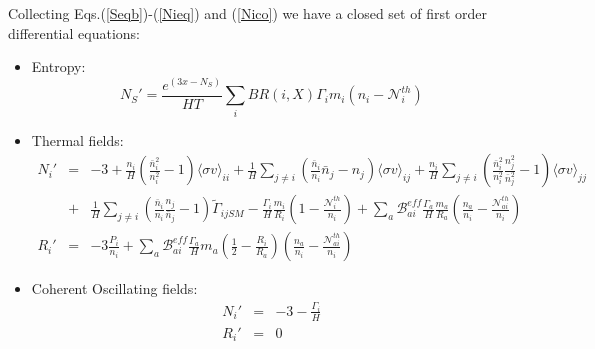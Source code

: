 \documentclass[preprint,notoc]{JHEP3}
\begin{document}
Collecting Eqs.(\ref{Seqb})-(\ref{Nieq}) and (\ref{Nico}) we have a closed set of first order differential equations:
\begin{itemize}
\item Entropy:
\begin{equation}
N_S' = \frac{e^{(3 x - N_S)}}{HT} \sum_{i} BR(i,X) \Gamma_i m_i \left(n_i -
\mathcal{N}_{i}^{th} \right) \label{eq:Sfin}
\end{equation}
\item Thermal fields:
\begin{eqnarray}
N_i'& = & -3
+ \frac{n_i}{H}\left( \frac{\bar{n}_i^2}{n_i^2} -1 \right) \langle \sigma v \rangle_{ii} 
+ \frac{1}{H} \sum_{j\neq i} \left( \frac{\bar{n}_i}{n_i} \bar{n}_j - n_j \right) \langle \sigma v \rangle_{ij}
+ \frac{n_i}{H} \sum_{j\neq i} \left(\frac{\bar{n}_i^2}{n_i^2}\frac{n_j^2}{\bar{n}_j^2}  - 1 \right) \langle \sigma v \rangle_{jj} \nonumber\\
&+& \frac{1}{H} \sum_{j\neq i} \left(\frac{\bar{n}_i}{n_i}\frac{n_j}{\bar{n}_j}  - 1\right)  \tilde{\Gamma}_{ijSM} 
 -  \frac{\Gamma_i}{H} \frac{m_i}{R_i}\left(1 - \frac{\mathcal{N}_{i}^{th}}{n_i} \right)
  +  \sum_{a} \mathcal{B}_{ai}^{eff} \frac{\Gamma_a}{H}
 \frac{m_a}{R_a}\left(\frac{n_a}{n_i} - \frac{\mathcal{N}_{ai}^{th}}{n_i}
  \right) \nonumber
 \\
R_i' & = &  -3 \frac{P_i}{n_i} + \sum_{a} \mathcal{B}_{ai}^{eff}
\frac{\Gamma_a}{H} m_a \left( \frac{1}{2} - \frac{R_i}{R_a} \right) \left(\frac{n_a}{n_i} -
\frac{\mathcal{N}_{ai}^{th}}{n_i} \right)
\end{eqnarray}
\item Coherent Oscillating fields:
\begin{eqnarray}
N_i' & = & -3 - \frac{\Gamma_i}{H} \nonumber \\
R_i' & = & 0 \label{eq:COeq}
\end{eqnarray}
\end{itemize}
\end{document}
